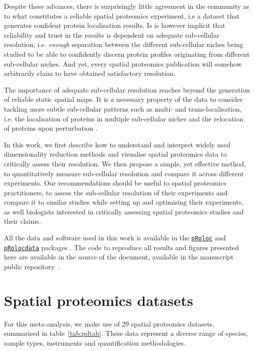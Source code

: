 \documentclass[12pt]{article}\usepackage[]{graphicx}\usepackage[]{color}
\newcommand{\Rpackage}[1]{\texttt{#1}}
\newcommand\Biocpkg[1]{%
  {\href{http://bioconductor.org/packages/#1}%
    {\Rpackage{#1}}}}
\newcommand\Biocexptpkg[1]{\Biocpkg{#1}}
\begin{document}
Despite these advances, there is surprisingly little agreement in the
community as to what constitutes a reliable spatial proteomics
experiment, i.e a dataset that generates confident protein
localisation results. Is is however implicit that reliability and
trust in the results is dependent on adequate sub-cellular resolution,
i.e. \textit{enough} separation between the different sub-cellular
niches being studied to be able to confidently discern protein
profiles originating from different sub-cellular niches. And yet,
every spatial proteomics publication will somehow arbitrarily claim to
have obtained satisfactory resolution.

The importance of adequate sub-cellular resolution reaches beyond the
generation of reliable static spatial maps. It is a necessary property
of the data to consider tackling more subtle sub-cellular patterns
such as multi- and trans-localisation, i.e. the localisation of
proteins in multiple sub-cellular niches and the relocation of
proteins upon perturbation \citep{Gatto:2014}.

\bigskip

In this work, we first describe how to understand and interpret widely
used dimensionality reduction methods and visualise spatial proteomics
data to critically assess their resolution. We then propose a simple,
yet effective method, to quantitatively measure sub-cellular
resolution and compare it across different experiments. Our
recommendations should be useful to spatial proteomics practitioners,
to assess the sub-cellular resolution of their experiments and compare
it to similar studies while setting up and optimising their
experiments, as well biologists interested in critically assessing
spatial proteomics studies and their claims.

All the data and software used in this work is available in the
\Biocpkg{pRoloc} and \Biocexptpkg{pRolocdata} packages
\citep{Gatto:2014a}. The code to reproduce all results and figures
presented here are available in the source of the document, available
in the manuscript public repository~\cite{qseprepo}.

\section{Spatial proteomics datasets}\label{sec:pdata}



For this meta-analysis, we make use of 29 spatial
proteomics datasets, summarised in table~\ref{tab:pdtab}. These data
represent a diverse range of species, sample types, instruments and
quantification methodologies.
\end{document}
